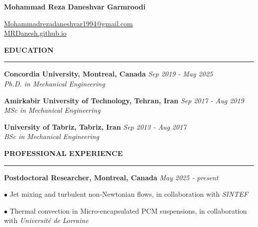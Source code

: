 \documentclass[10pt]{article}
\begin{document}
	
	\begin{center}
		{\color{violet}\Large \textbf{Mohammad Reza Daneshvar Garmroodi}}
		
		{\color{blue}\small \href{mailto:Mohammadrezadaneshvar1994@gmail.com}{Mohammadrezadaneshvar1994@gmail.com}} \\
		
		{\color{blue}\small \href{https://mrdanesh.github.io}{MRDanesh.github.io}}
	\end{center}
	 
	
	
	\vspace{3mm}
	
	
	\noindent \textbf{\color{violet} EDUCATION}
	
	\vspace{-2mm}
	
	\noindent\rule[0.5ex]{\linewidth}{1pt}
	
	
		{\noindent  \bf Concordia University, Montreal, Canada} \hfill {\em Sep 2019 - May 2025} 
		\\ \textit{Ph.D. in Mechanical Engineering}
		
		\vspace{1.5mm}
		
		{\noindent  \bf Amirkabir University of Technology, Tehran, Iran} \hfill {\em Sep 2017 - Aug 2019} 
		\\ \textit{MSc in Mechanical Engineering}
	
		\vspace{1.5mm}
		
		{\noindent \bf University of Tabriz, Tabriz, Iran} \hfill {\em Sep 2013 - Aug 2017} 
		\\ \textit{BSc in Mechanical Engineering}
		
		
		\vspace{2.5mm}
		
		
		\noindent \textbf{\color{violet} PROFESSIONAL EXPERIENCE}
		
		\vspace{-2mm}
		
		\noindent\rule[0.5ex]{\linewidth}{1pt}
		
		
		{\noindent  \bf Postdoctoral Researcher, Montreal, Canada} \hfill {\em May 2025 - present} 
		
		$\bullet$ Jet mixing and turbulent non-Newtonian flows, in collaboration with \textit{SINTEF }

		$\bullet$ Thermal convection in Micro-encapsulated PCM suspensions, in collaboration with \textit{Université de Lorraine} 
		
\end{document}

